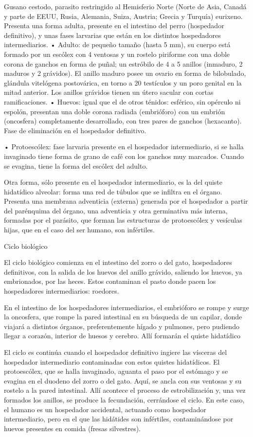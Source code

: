 Gusano cestodo, parasito restringido al Hemisferio Norte (Norte de Asia, Canadá y parte de EEUU, Rusia, Alemania, Suiza, Austria; Grecia y Turquía) eurixeno. Presenta una forma adulta, presente en el intestino del perro (hospedador definitivo), y unas fases larvarias que están en los distintos hospedadores intermediarios.
• Adulto: de pequeño tamaño (hasta 5 mm), su cuerpo está formado por un escólex con 4 ventosas y un rostelo piriforme con una doble corona de ganchos en forma de puñal; un estróbilo de 4 a 5 anillos (inmaduro, 2 maduros y 2 grávidos). El anillo maduro posee un ovario en forma de bilobulado, glándula vitelógena postovárica, en torno a 20 testículos y un poro genital en la mitad anterior. Los anillos grávidos tienen un útero sacular con cortas ramificaciones.
• Huevos: igual que el de otros ténidos: esférico, sin opérculo ni espolón, presentan una doble corona radiada (embrióforo) con un embrión (oncosfera) completamente desarrollado, con tres pares de ganchos (hexacanto). Fase de eliminación en el hospedador definitivo.

• Protoescólex: fase larvaria presente en el hospedador intermediario, si se halla invaginado tiene forma de grano de café con los ganchos muy marcados. Cuando se evagina, tiene la forma del escólex del adulto.

Otra forma, sólo presente en el hospedador intermediario, es la del quiste hidatídico alveolar: forma una red de túbulos que se infiltra en el órgano. Presenta una membrana adventicia (externa) generada por el hospedador a partir del parénquima del órgano, una adventicia y otra germinativa más interna, formadas por el parásito, que forman las estructuras de protoescólex y vesículas hijas, que en el caso del ser humano, son infértiles.

Ciclo biológico

El ciclo biológico comienza en el intestino del zorro o del gato, hospedadores definitivos, con la salida de los huevos del anillo grávido, saliendo los huevos, ya embrionados, por las heces. Estos contaminan el pasto donde pacen los hospedadores intermediarios: roedores.

En el intestino de los hospedadores intermediarios, el embrióforo se rompe y surge la oncosfera, que rompe la pared intestinal en su búsqueda de un capilar, donde viajará a distintos órganos, preferentemente hígado y pulmones, pero pudiendo llegar a corazón, interior de huesos y cerebro. Allí formarán el quiste hidatídico

El ciclo es continúa cuando el hospedador definitivo ingiere las vísceras del hospedador intermediario contaminadas con estos quistes hidatídicos. El protoescólex, que se halla invaginado, aguanta el paso por el estómago y se evagina en el duodeno del zorro o del gato. Aquí, se ancla con sus ventosas y su rostelo a la pared intestinal. Allí acontece el proceso de estrobilización y, una vez formados los anillos, se produce la fecundación, cerrándose el ciclo.
En este caso, el humano es un hospedador accidental, actuando como hospedador intermediario, pero en el que las hidátides son infértiles, contaminándose por huevos presentes en comida (fresas silvestres).

